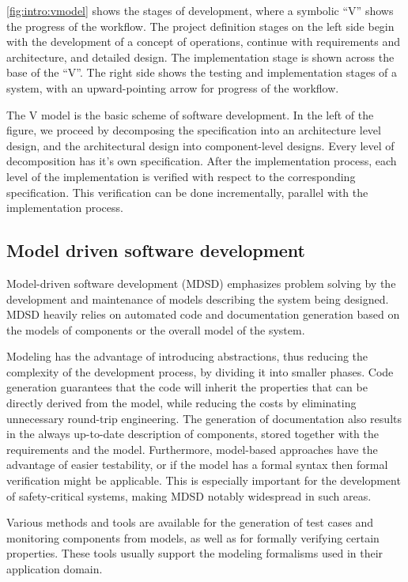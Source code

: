\cref{fig:intro:vmodel} shows the stages of development, where a symbolic ``V'' shows the progress of the workflow. The project definition stages on the left side begin with the development of a concept of operations, continue with requirements and architecture, and detailed design. The implementation stage is shown across the base of the ``V''. The right side shows the testing and implementation stages of a system, with an upward-pointing arrow for progress of the workflow\citep{vmodel}. 

The V model is the basic scheme of software development. In the left of the figure, we proceed by decomposing the specification into an architecture level design, and the architectural design into component-level designs. Every level of decomposition has it's own specification. After the implementation process, each level of the implementation is verified with respect to the corresponding specification. This verification can be done incrementally, parallel  with the implementation process.

\subsection{Model driven software development}

Model-driven software development (MDSD) emphasizes problem solving by the development and maintenance of models describing the system being designed. MDSD heavily relies on automated code and documentation generation based on the models of components or the overall model of the system. 

Modeling has the advantage of introducing abstractions, thus reducing the complexity of the development process, by dividing it into smaller phases. Code generation guarantees that the code will inherit the properties that can be directly derived from the model, while reducing the costs by eliminating unnecessary round-trip engineering. The generation of documentation also results in the always up-to-date description of components, stored together with the requirements and the model. Furthermore, model-based approaches have the advantage of easier testability, or if the model has a formal syntax then formal verification might be applicable. This is especially important for the development of safety-critical systems, making MDSD notably widespread in such areas.

Various methods and tools are available for the generation of test cases and monitoring components from models, as well as for formally verifying certain properties. These tools usually support the modeling formalisms used in their application domain.

